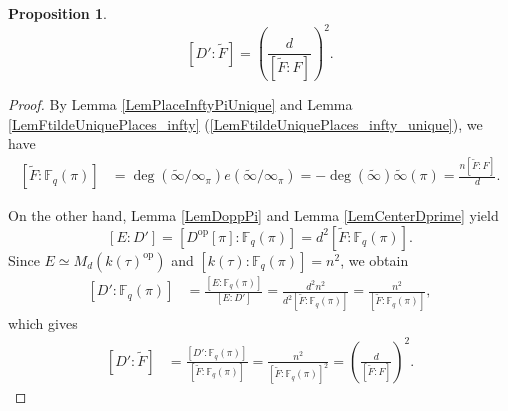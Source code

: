 \documentclass[10pt]{amsart}
\theoremstyle{plain}
\newtheorem{prop}[thm]{Proposition}
\theoremstyle{definition}
\newcommand{\opp}{\mathrm{op}}
\newcommand{\bF}{\mathbb{F}}
\begin{document}
\begin{prop}\label{PropFtildeDivd}
	\[
	[D':\tilde{F}]=\left(\frac{d}{[\tilde{F}:F]}\right)^2.
	\]
\end{prop}
\begin{proof}
	By Lemma \ref{LemPlaceInftyPiUnique} and Lemma \ref{LemFtildeUniquePlaces_infty} (\ref{LemFtildeUniquePlaces_infty_unique}), we have
	\[
	\begin{aligned}
		[\tilde{F}:\bF_q(\pi)]&=\deg(\tilde{\infty}/\infty_\pi)e(\tilde{\infty}/\infty_\pi)
		=-\deg(\tilde{\infty})\tilde{\infty}(\pi)
		=\frac{n[\tilde{F}:F]}{d}.
	\end{aligned}
	\]
	
	On the other hand, 
	Lemma \ref{LemDoppPi} and Lemma \ref{LemCenterDprime} yield
	\[
	[E:D']=[D^\opp[\pi]:\bF_q(\pi)]=d^2[\tilde{F}:\bF_q(\pi)].
	\]
	Since $E\simeq M_d(k(\tau)^\opp)$ and $[k(\tau):\bF_q(\pi)]=n^2$, we obtain
	\[
	\begin{aligned}
		[D':\bF_q(\pi)]&=\frac{[E:\bF_q(\pi)]}{[E:D']}=\frac{d^2n^2}{d^2[\tilde{F}:\bF_q(\pi)]}=\frac{n^2}{[\tilde{F}:\bF_q(\pi)]},
	\end{aligned}
	\]
	which gives
	\[
	\begin{aligned}
		[D':\tilde{F}]&=\frac{[D':\bF_q(\pi)]}{[\tilde{F}:\bF_q(\pi)]}=
		\frac{n^2}{[\tilde{F}:\bF_q(\pi)]^2}=\left(\frac{d}{[\tilde{F}:F]}\right)^2.
	\end{aligned}
	\]
\end{proof}
\end{document}

